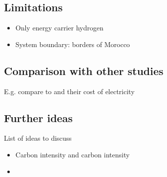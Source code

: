 \subsection{Limitations}
\begin{itemize}
    \item Only energy carrier hydrogen
    \item System boundary: borders of Morocco
\end{itemize}
\subsection{Comparison with other studies}
E.g. compare to \cite{Hampp2021} and their cost of electricity

\subsection{Further ideas}
List of ideas to discuss
\begin{itemize}
    \item Carbon intensity and carbon intensity
    \item 
\end{itemize}